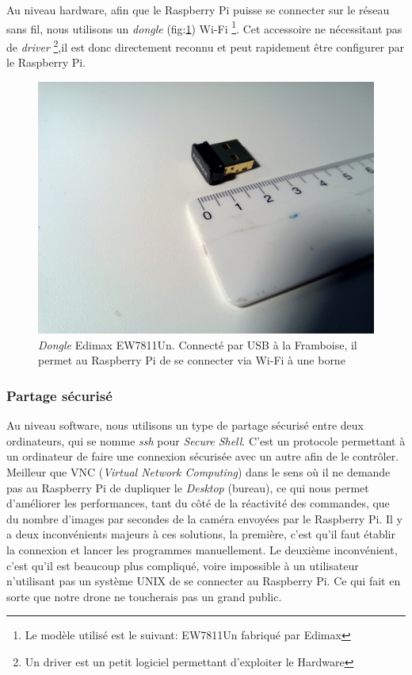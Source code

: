 \documentclass[a4paper,11pt]{report}
\begin{document}
{Au niveau hardware, afin que le Raspberry Pi puisse se connecter sur le réseau sans fil, nous utilisons un \textit{dongle} (fig:\ref{Edimax}) Wi-Fi \footnote{Le modèle utilisé est le suivant: EW7811Un fabriqué par Edimax}. Cet accessoire ne nécessitant pas de \textit{driver} \footnote{Un driver est un petit logiciel permettant d'exploiter le Hardware},il est donc directement reconnu et peut rapidement être configurer par le Raspberry Pi. 
\begin{figure}[!h]
\begin{center}
\includegraphics[scale=0.38, trim=300 300 300 0, clip=true]{Edimax}
\caption[\textit{Dongle} Edimax EW7811Un]{\textit{Dongle} Edimax EW7811Un. Connecté par USB à la Framboise, il permet au Raspberry Pi de se connecter via Wi-Fi à une borne\label{Edimax}}
\end{center}
\end{figure} 

\subsubsection{Partage sécurisé}

Au niveau software, nous utilisons un type de partage sécurisé entre deux ordinateurs, qui se nomme \textit{ssh} pour \textit{Secure Shell}. C'est un protocole permettant à un ordinateur de faire une connexion sécurisée avec un autre afin de le contrôler. Meilleur que VNC (\textit{Virtual Network Computing}) dans le sens où il ne demande pas au Raspberry Pi de dupliquer le \textit{Desktop} (bureau), ce qui nous permet d'améliorer les performances, tant du côté de la réactivité des commandes, que du nombre d'images par secondes de la caméra envoyées par le Raspberry Pi. Il y a deux inconvénients majeurs à ces solutions, la première, c'est qu'il faut établir la connexion et lancer les programmes manuellement. Le deuxième inconvénient, c'est qu'il est beaucoup plus compliqué, voire impossible à un utilisateur n'utilisant pas un système UNIX de se connecter au Raspberry Pi. Ce qui fait en sorte que notre drone ne toucherais pas un grand public.

}
\end{document}
